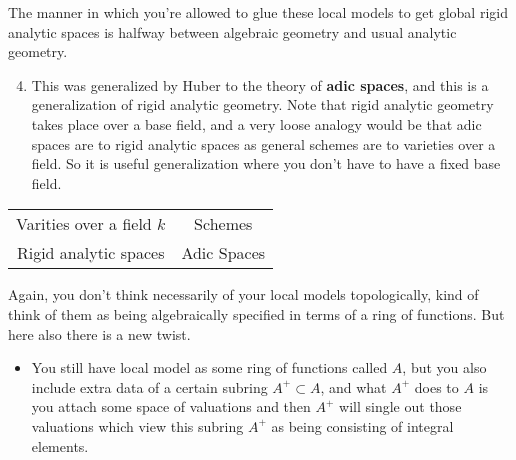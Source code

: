 The manner in which you're allowed to glue these local models to get global rigid analytic spaces is halfway between algebraic geometry and usual analytic geometry.


\begin{enumerate}
    \setcounter{enumi}{3} 

    \item This was generalized by Huber to the theory of \textbf{adic spaces}, and this is a generalization of rigid analytic geometry. Note that rigid analytic geometry takes place over a base field, and a very loose analogy would be that adic spaces are to rigid analytic spaces as general schemes are to varieties over a field. So it is useful generalization where you don't have to have a fixed base field.
\end{enumerate}

\begin{center}
\begin{tabular}{ |c|c| } 
 \hline
 Varities over a field $k$ & Schemes \\ 
 Rigid analytic spaces & Adic Spaces \\ 

 \hline
\end{tabular}
\end{center}


Again, you don't think necessarily of your local models topologically, kind of think of them as being algebraically specified in terms of a ring of functions. But here also there is a new twist. 

\begin{itemize}
    \item  You still have local model as some ring of functions called $A$, but you also include extra data of a certain subring $A^+ \subset A $, and what $A^{+}$ does to $A$ is you attach some space of valuations and then $A^+$ will single out those valuations which view this subring $A^+$ as being consisting of integral elements.
\end{itemize}

